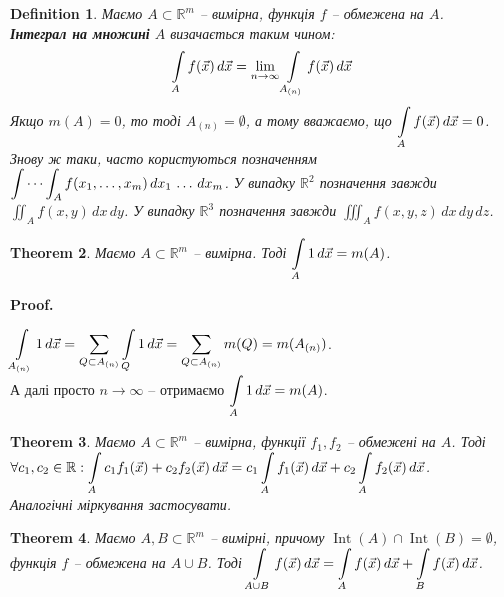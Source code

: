 \documentclass[a4paper, 10pt]{article}
\makeatletter
\def\qed{$\blacksquare$}
\theoremstyle{theoremdd}
\newtheorem{theorem}{Theorem}[subsection]
\theoremstyle{theoremdd}
\newtheorem{definition}[theorem]{Definition}
\theoremstyle{theoremdd}
\theoremstyle{theoremdd}
\theoremstyle{theoremdd}
\theoremstyle{theoremdd}
\theoremstyle{theoremdd}
\theoremstyle{theoremdd}
\theoremstyle{theoremdd}
\theoremstyle{theoremdd}
\theoremstyle{theoremdd}
\theoremstyle{theoremdd}
\theoremstyle{theoremdd}
\theoremstyle{theoremdd}
\theoremstyle{theoremdd}
\renewenvironment{proof}[1][Proof.\\]{\par
\pushQED{\hfill \qed}%
\normalfont \topsep6\p@\@plus6\p@\relax
\trivlist
\item\relax
{\bfseries
#1\@addpunct{.}}\hspace\labelsep\ignorespaces
}{%
\popQED\endtrivlist\@endpefalse
}
\DeclareMathOperator{\Int}{Int}
\makeatother
\begin{document}
\begin{definition}
Маємо $A \subset \mathbb{R}^m$ -- вимірна, функція $f$ -- обмежена на $A$.\\
\textbf{Інтеграл на множині} $A$ визачається таким чином:
\begin{align*}
\int\displaylimits_A f(\vec{x})\,d\vec{x} = \lim_{n \to \infty} \int\displaylimits_{A_{(n)}} f(\vec{x})\,d\vec{x}
\end{align*}
Якщо $m(A) = 0$, то тоді $A_{(n)} = \emptyset$, а тому вважаємо, що $\displaystyle\int\displaylimits_A f(\vec{x})\,d\vec{x} = 0$.\\
Знову ж таки, часто користуються позначенням $\displaystyle\idotsint_A f(x_1,\dots,x_m)\,dx_1\,\dots\,dx_m$. У випадку $\mathbb{R}^2$ позначення завжди $\displaystyle\iint_A f(x,y)\,dx\,dy$. У випадку $\mathbb{R}^3$ позначення завжди $\displaystyle\iiint_A f(x,y,z)\,dx\,dy\,dz$.
\end{definition}

\begin{theorem}
Маємо $A \subset \mathbb{R}^m$ -- вимірна. Тоді $\displaystyle\int\displaylimits_A 1\,d\vec{x}  = m(A)$.
\end{theorem}

\begin{proof}
$\displaystyle\int\displaylimits_{A_{(n)}} 1\,d\vec{x} = \sum_{Q \subset A_{(n)}} \int\displaylimits_Q 1\,d\vec{x} = \sum_{Q \subset A_{(n)}} m(Q) = m(A_{(n)})$.\\
А далі просто $n \to \infty$ -- отримаємо $\displaystyle\int\displaylimits_A 1\,d\vec{x} = m(A)$.
\end{proof}

\begin{theorem}
Маємо $A \subset \mathbb{R}^m$ -- вимірна, функції $f_1,f_2$ -- обмежені на $A$. Тоді \\ $\forall c_1,c_2 \in \mathbb{R}: \displaystyle\int\displaylimits_A c_1 f_1(\vec{x}) + c_2 f_2(\vec{x})\,d\vec{x} = c_1 \int\displaylimits_A f_1(\vec{x}) \,d\vec{x} + c_2 \int\displaylimits_A f_2(\vec{x})\,d\vec{x}$.\\
\textit{Аналогічні міркування застосувати.}
\end{theorem}

\begin{theorem}
Маємо $A,B \subset \mathbb{R}^m$ -- вимірні, причому $\Int(A) \cap \Int(B) = \emptyset$, функція $f$ -- обмежена на $A \cup B$. Тоді $\displaystyle\int\displaylimits_{A \cup B} f(\vec{x})\,d\vec{x} = \int\displaylimits_{A} f(\vec{x})\,d\vec{x} + \int\displaylimits_{B} f(\vec{x})\,d\vec{x}$.
\end{theorem}
\end{document}
